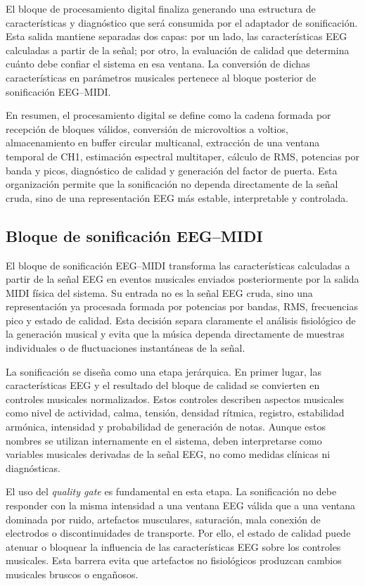 \documentclass[../main.tex]{subfiles}
\begin{document}
El bloque de procesamiento digital finaliza generando una estructura de características y diagnóstico que será consumida por el adaptador de sonificación. Esta salida mantiene separadas dos capas: por un lado, las características EEG calculadas a partir de la señal; por otro, la evaluación de calidad que determina cuánto debe confiar el sistema en esa ventana. La conversión de dichas características en parámetros musicales pertenece al bloque posterior de sonificación EEG--MIDI.

En resumen, el procesamiento digital se define como la cadena formada por recepción de bloques válidos, conversión de microvoltios a voltios, almacenamiento en buffer circular multicanal, extracción de una ventana temporal de CH1, estimación espectral multitaper, cálculo de RMS, potencias por banda y picos, diagnóstico de calidad y generación del factor de puerta. Esta organización permite que la sonificación no dependa directamente de la señal cruda, sino de una representación EEG más estable, interpretable y controlada.

\subsection{Bloque de sonificación EEG--MIDI}

El bloque de sonificación EEG--MIDI transforma las características calculadas a partir de la señal EEG en eventos musicales enviados posteriormente por la salida MIDI física del sistema. Su entrada no es la señal EEG cruda, sino una representación ya procesada formada por potencias por bandas, RMS, frecuencias pico y estado de calidad. Esta decisión separa claramente el análisis fisiológico de la generación musical y evita que la música dependa directamente de muestras individuales o de fluctuaciones instantáneas de la señal.

La sonificación se diseña como una etapa jerárquica. En primer lugar, las características EEG y el resultado del bloque de calidad se convierten en controles musicales normalizados. Estos controles describen aspectos musicales como nivel de actividad, calma, tensión, densidad rítmica, registro, estabilidad armónica, intensidad y probabilidad de generación de notas. Aunque estos nombres se utilizan internamente en el sistema, deben interpretarse como variables musicales derivadas de la señal EEG, no como medidas clínicas ni diagnósticas.

El uso del \textit{quality gate} es fundamental en esta etapa. La sonificación no debe responder con la misma intensidad a una ventana EEG válida que a una ventana dominada por ruido, artefactos musculares, saturación, mala conexión de electrodos o discontinuidades de transporte. Por ello, el estado de calidad puede atenuar o bloquear la influencia de las características EEG sobre los controles musicales. Esta barrera evita que artefactos no fisiológicos produzcan cambios musicales bruscos o engañosos.
\end{document}
